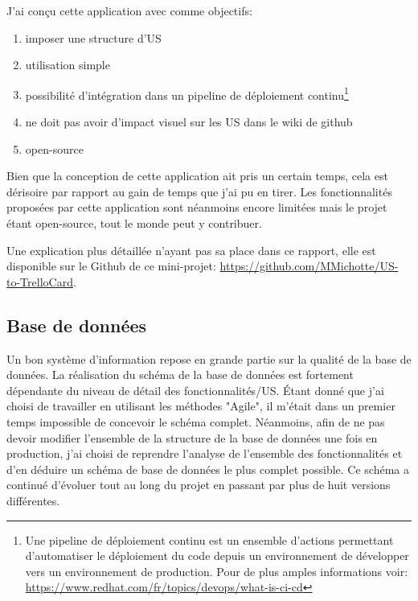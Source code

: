 \newparasm

J'ai conçu cette application avec comme objectifs: 
\begin{enumerate}
  \item imposer une structure d'US
  \item utilisation simple
  \item possibilité d'intégration dans un pipeline de déploiement continu\footnote{Une pipeline de déploiement continu est un ensemble d'actions permettant d'automatiser le déploiement du code depuis un environnement de développer vers un environnement de production. Pour de plus amples informations voir: \url{https://www.redhat.com/fr/topics/devops/what-is-ci-cd}}
  \item ne doit pas avoir d'impact visuel sur les US dans le wiki de github
  \item open-source
\end{enumerate}

\newpara

Bien que la conception de cette application ait pris un certain temps, cela est dérisoire par rapport au gain de temps que j'ai pu en tirer. Les fonctionnalités proposées par cette application sont néanmoins encore limitées mais le projet étant open-source, tout le monde peut y contribuer. 

\newpara

Une explication plus détaillée n'ayant pas sa place dans ce rapport, elle est disponible sur le Github de ce mini-projet: \url{https://github.com/MMichotte/US-to-TrelloCard}.


\subsection{Base de données}
Un bon système d'information repose en grande partie sur la qualité de la base de données.  
La réalisation du schéma de la base de données est fortement dépendante du niveau de détail des fonctionnalités/US. Étant donné que j'ai choisi de travailler en utilisant les méthodes "Agile", il m'était dans un premier temps impossible de concevoir le schéma complet. Néanmoins, afin de ne pas devoir modifier l'ensemble de la structure de la base de données une fois en production, j'ai choisi de reprendre l'analyse de l'ensemble des fonctionnalités et d'en déduire un schéma de base de données le plus complet possible. Ce schéma a continué d'évoluer tout au long du projet en passant par plus de huit versions différentes.

\newpara

